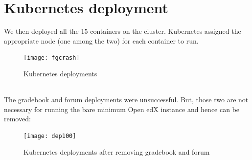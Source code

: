 \documentclass[12pt]{report}
\begin{document}
\section{Kubernetes deployment}
We then deployed all the 15 containers on the cluster. Kubernetes assigned the appropriate node (one among the two) for each container to run.
\begin{figure}[h!]
	\begin{center}
		\texttt{[image: fgcrash]}
		\caption{Kubernetes deployments}
	\end{center}
\end{figure}
\\The gradebook and forum deployments were unsuccessful. But, those two are not necessary for running the bare minimum Open edX instance and hence can be removed:
\begin{figure}[h!]
	\begin{center}
		\texttt{[image: dep100]}
		\caption{Kubernetes deployments after removing gradebook and forum}
	\end{center}
\end{figure}
\end{document}
